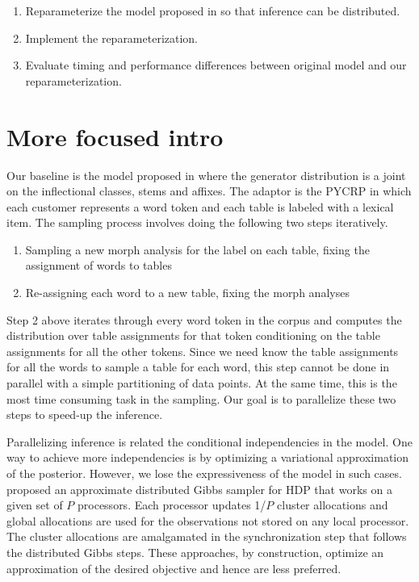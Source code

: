 \documentclass{article}
\begin{document}
\begin{enumerate}[1.]
\item Reparameterize the model proposed in \cite{goldwater2011} so
  that inference can be distributed.
\item Implement the reparameterization.
\item Evaluate timing and performance differences between original
  model and our reparameterization.
\end{enumerate}

\section{More focused intro}

Our baseline is the model proposed in \cite{goldwater2011} where the 
generator distribution is a joint on the inflectional classes, stems 
and affixes. The adaptor is the PYCRP in which each customer represents 
a word token and each table is labeled with a lexical item. The sampling 
process involves doing the following two steps iteratively.

\begin{enumerate}[1.]
\item Sampling a new morph analysis for the label on each table,
fixing the assignment of words to tables
\item Re-assigning each word to a new table, fixing the morph analyses
\end{enumerate}

Step 2 above iterates through every word token in the corpus and computes
the distribution over table assignments for that token conditioning on 
the table assignments for all the other tokens. Since we need know the 
table assignments for all the words to sample a table for each word, this
step cannot be done in parallel with a simple partitioning of data points. 
At the same time, this is the most time consuming task in the sampling. 
Our goal is to parallelize these two steps to speed-up the inference.

Parallelizing inference is related the conditional independencies in the 
model. One way to achieve more independencies is by optimizing a variational 
approximation of the posterior. However, we lose the expressiveness of the 
model in such cases. \cite{asuncion2008asynchronous} proposed an approximate
distributed Gibbs sampler for HDP that works on a given set of $P$ processors.
Each processor updates 1/$P$ cluster allocations and global allocations are 
used for the observations not stored on any local processor. The cluster
allocations are amalgamated in the synchronization step that follows the 
distributed Gibbs steps. These approaches, by construction, optimize an 
approximation of the desired objective and hence are less preferred.
\end{document}
